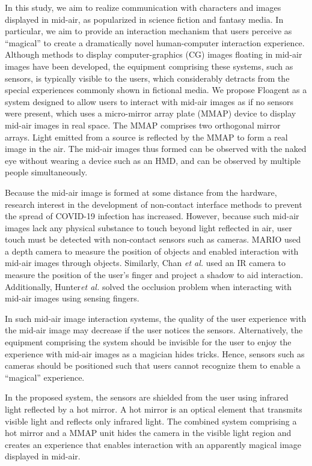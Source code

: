 \documentclass[sigconf]{acmart}
\begin{document}
In this study, we aim to realize communication with characters and images displayed in mid-air, as popularized in science fiction and fantasy media.
In particular, we aim to provide an interaction mechanism that users perceive as “magical” to create a dramatically novel human-computer interaction experience.
Although methods to display computer-graphics (CG) images floating in mid-air images have been developed, the equipment comprising these systems, such as sensors, is typically visible to the users, which considerably detracts from the special experiences commonly shown in fictional media.
We propose Floagent as a system designed to allow users to interact with mid-air images as if no sensors were present, which uses a micro-mirror array plate (MMAP) device to display mid-air images in real space.
The MMAP comprises two orthogonal mirror arrays. Light emitted from a source is reflected by the MMAP to form a real image in the air.
The mid-air images thus formed can be observed with the naked eye without wearing a device such as an HMD, and can be observed by multiple people simultaneously.

Because the mid-air image is formed at some distance from the hardware, research interest in the development of non-contact interface methods to prevent the spread of COVID-19 infection has increased.
However, because such mid-air images lack any physical substance to touch beyond light reflected in air, user touch must be detected with non-contact sensors such as cameras.
MARIO\cite{MARIO} used a depth camera to measure the position of objects and enabled interaction with mid-air images through objects.
Similarly, Chan \textit{et al.}\cite{Void} used an IR camera to measure the position of the user's finger and project a shadow to aid interaction.
Additionally, Hunter\textit{et al.}\cite{Seth} solved the occlusion problem when interacting with mid-air images using sensing fingers.

In such mid-air image interaction systems, the quality of the user experience with the mid-air image may decrease if the user notices the sensors.
Alternatively, the equipment comprising the system should be invisible for the user to enjoy the experience with mid-air images as a magician hides tricks.
Hence, sensors such as cameras should be positioned such that users cannot recognize them to enable a “magical” experience.

In the proposed system, the sensors are shielded from the user using infrared light reflected by a hot mirror.
A hot mirror is an optical element that transmits visible light and reflects only infrared light.
The combined system comprising a hot mirror and a MMAP unit hides the camera in the visible light region and creates an experience that enables interaction with an apparently magical image displayed in mid-air.
\end{document}
